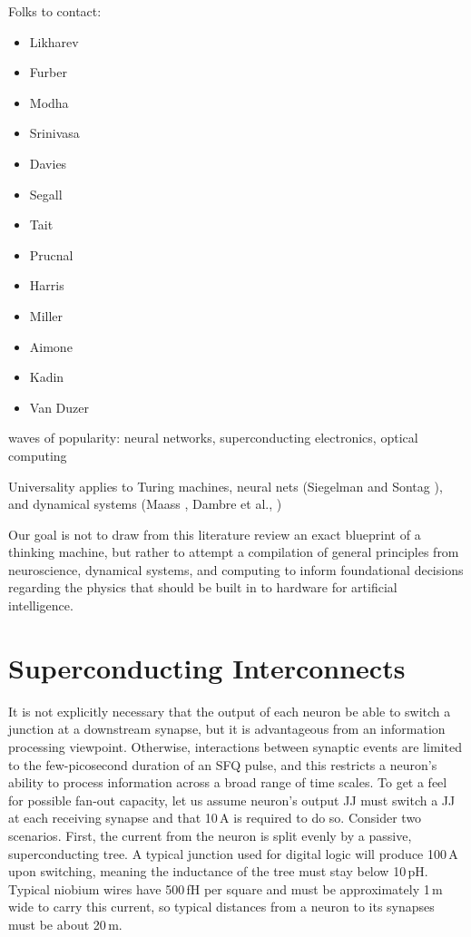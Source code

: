 \documentclass[twocolumn]{article}
\begin{document}
\vspace{3em}
Folks to contact:
\begin{itemize} 
\item Likharev
\item Furber
\item Modha
\item Srinivasa
\item Davies
\item Segall
\item Tait
\item Prucnal
\item Harris
\item Miller
\item Aimone
\item Kadin
\item Van Duzer
\end{itemize}
	
\vspace{3em}
waves of popularity: neural networks, superconducting electronics, optical computing	
	
\vspace{3em}
Universality applies to Turing machines, neural nets (Siegelman and Sontag \cite{siso1991}), and dynamical systems (Maass \cite{}, Dambre et al., \cite{dave2012})	

\vspace{3em}
Our goal is not to draw from this literature review an exact blueprint of a thinking machine, but rather to attempt a compilation of general principles from neuroscience, dynamical systems, and computing to inform foundational decisions regarding the physics that should be built in to hardware for artificial intelligence.
	
\newpage
\appendix

\section{\label{sec:superconducting_interconnects}Superconducting Interconnects}
It is not explicitly necessary that the output of each neuron be able to switch a junction at a downstream synapse, but it is advantageous from an information processing viewpoint. Otherwise, interactions between synaptic events are limited to the few-picosecond duration of an SFQ pulse, and this restricts a neuron's ability to process information across a broad range of time scales. To get a feel for possible fan-out capacity, let us assume neuron's output JJ must switch a JJ at each receiving synapse and that 10\,\textmu A is required to do so. Consider two scenarios. First, the current from the neuron is split evenly by a passive, superconducting tree. A typical junction used for digital logic will produce 100\,\textmu A upon switching, meaning the inductance of the tree must stay below 10\,pH. Typical niobium wires have 500\,fH per square and must be approximately 1\,\textmu m wide to carry this current, so typical distances from a neuron to its synapses must be about 20\,\textmu m.
\end{document}
